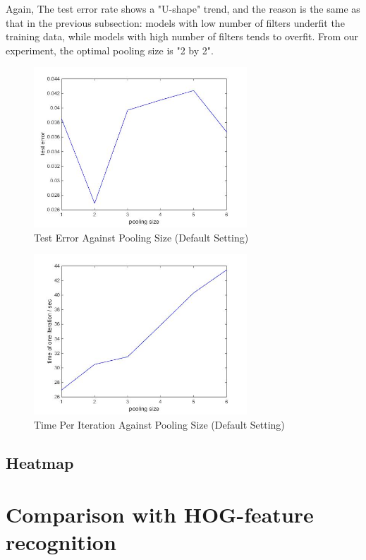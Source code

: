 \documentclass[10pt,twocolumn]{article}
\begin{document}
Again, The test error rate shows a "U-shape" trend, and the reason is the same as that in the previous subsection: models with low number of filters underfit the training data, while models with high number of filters tends to overfit. From our experiment, the optimal pooling size is "2 by 2".


\begin{figure}

\includegraphics[width = 8cm]{figure/test_error_vs_pooling_size}
\caption{Test Error Against Pooling Size (Default Setting)}
\label{fig:test_error_vs_pooling_size}
\end{figure}

\begin{figure}

\includegraphics[width = 8cm]{figure/iter_time_vs_pooling_size}
\caption{Time Per Iteration Against Pooling Size (Default Setting)}
\label{fig:iter_time_vs_pooling_size}
\end{figure}

\FloatBarrier

\subsection{Heatmap}



\section{Comparison with HOG-feature recognition} \label{sec:evalfeature}
\end{document}
